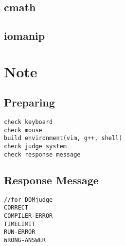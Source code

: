 \documentclass[a4paper, landscape, 8pt]{article}
\begin{document}
\begin{multicols*}{3}
\subsection{cmath}

\subsection{iomanip}


\section{Note}
\subsection{Preparing}
\begin{lstlisting}[]
check keyboard
check mouse
build environment(vim, g++, shell)
check judge system
check response message
\end{lstlisting}
\subsection{Response Message}
\begin{lstlisting}[]
//for DOMjudge
CORRECT
COMPILER-ERROR
TIMELIMIT
RUN-ERROR
WRONG-ANSWER
\end{lstlisting}

\end{multicols*}
\end{document}
